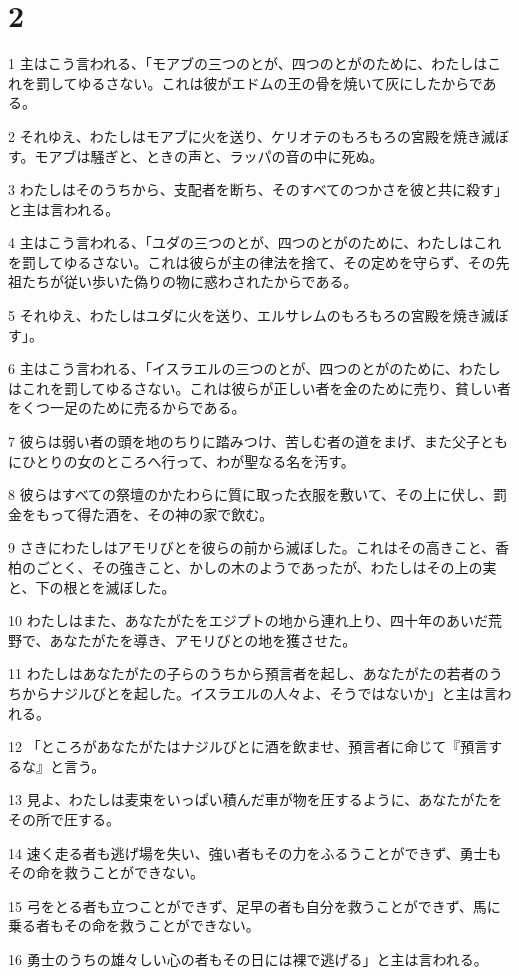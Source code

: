 \chapter{2}

\par 1 主はこう言われる、「モアブの三つのとが、四つのとがのために、わたしはこれを罰してゆるさない。これは彼がエドムの王の骨を焼いて灰にしたからである。
\par 2 それゆえ、わたしはモアブに火を送り、ケリオテのもろもろの宮殿を焼き滅ぼす。モアブは騒ぎと、ときの声と、ラッパの音の中に死ぬ。
\par 3 わたしはそのうちから、支配者を断ち、そのすべてのつかさを彼と共に殺す」と主は言われる。
\par 4 主はこう言われる、「ユダの三つのとが、四つのとがのために、わたしはこれを罰してゆるさない。これは彼らが主の律法を捨て、その定めを守らず、その先祖たちが従い歩いた偽りの物に惑わされたからである。
\par 5 それゆえ、わたしはユダに火を送り、エルサレムのもろもろの宮殿を焼き滅ぼす」。
\par 6 主はこう言われる、「イスラエルの三つのとが、四つのとがのために、わたしはこれを罰してゆるさない。これは彼らが正しい者を金のために売り、貧しい者をくつ一足のために売るからである。
\par 7 彼らは弱い者の頭を地のちりに踏みつけ、苦しむ者の道をまげ、また父子ともにひとりの女のところへ行って、わが聖なる名を汚す。
\par 8 彼らはすべての祭壇のかたわらに質に取った衣服を敷いて、その上に伏し、罰金をもって得た酒を、その神の家で飲む。
\par 9 さきにわたしはアモリびとを彼らの前から滅ぼした。これはその高きこと、香柏のごとく、その強きこと、かしの木のようであったが、わたしはその上の実と、下の根とを滅ぼした。
\par 10 わたしはまた、あなたがたをエジプトの地から連れ上り、四十年のあいだ荒野で、あなたがたを導き、アモリびとの地を獲させた。
\par 11 わたしはあなたがたの子らのうちから預言者を起し、あなたがたの若者のうちからナジルびとを起した。イスラエルの人々よ、そうではないか」と主は言われる。
\par 12 「ところがあなたがたはナジルびとに酒を飲ませ、預言者に命じて『預言するな』と言う。
\par 13 見よ、わたしは麦束をいっぱい積んだ車が物を圧するように、あなたがたをその所で圧する。
\par 14 速く走る者も逃げ場を失い、強い者もその力をふるうことができず、勇士もその命を救うことができない。
\par 15 弓をとる者も立つことができず、足早の者も自分を救うことができず、馬に乗る者もその命を救うことができない。
\par 16 勇士のうちの雄々しい心の者もその日には裸で逃げる」と主は言われる。


